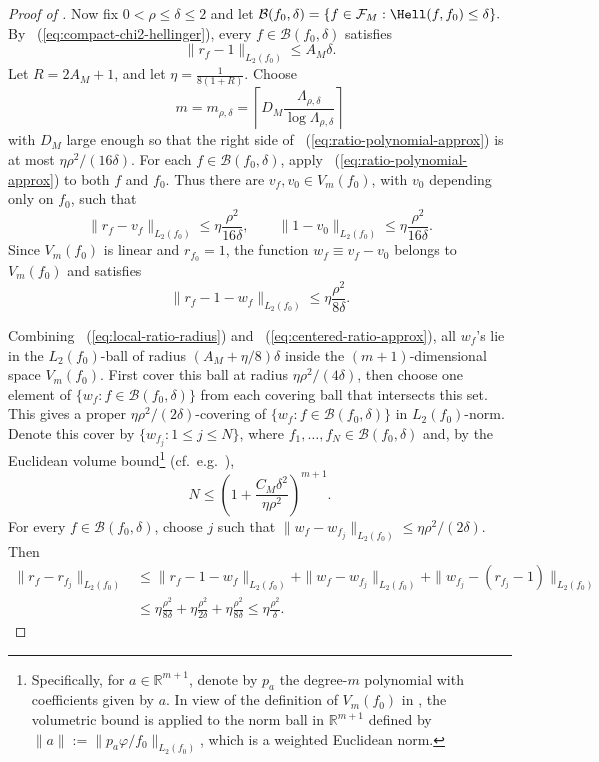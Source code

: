 \documentclass[letterpaper,11pt]{article}
\newcommand{\eqref}[1]{~(\ref{#1})}
\newcommand{\reals}{\mathbb{R}}
\newcommand{\calF}{{\mathcal{F}}}
\theoremstyle{definition}
\begin{document}
\begin{proof}[Proof of ]
Now fix $0<\rho\le\delta\le2$ and let
$
\mathcal B(f_0,\delta)=\{f\in\calF_M:\Hell(f,f_0)\le\delta\}.
$
By \eqref{eq:compact-chi2-hellinger}, every $f\in\mathcal B(f_0,\delta)$
satisfies
\begin{equation}
\label{eq:local-ratio-radius}
\|r_f-1\|_{L_2(f_0)}\le A_M\delta.
\end{equation}
Let $R=2A_M+1$, and let $\eta=\frac{1}{8(1+R)}$.
Choose
\[
m=m_{\rho,\delta}
=\left\lceil D_M
\frac{\Lambda_{\rho,\delta}}{\log\Lambda_{\rho,\delta}}\right\rceil
\]
with $D_M$ large enough so that the right side of
\eqref{eq:ratio-polynomial-approx} is at most
$\eta\rho^2/(16\delta)$.  For each $f\in\mathcal B(f_0,\delta)$, apply
\eqref{eq:ratio-polynomial-approx} to both $f$ and $f_0$.  Thus there are
$v_f,v_0\in V_m(f_0)$, with $v_0$ depending only on $f_0$, such that
\[
\|r_f-v_f\|_{L_2(f_0)}\le \eta\frac{\rho^2}{16\delta},
\qquad
\|1-v_0\|_{L_2(f_0)}\le \eta\frac{\rho^2}{16\delta}.
\]
Since $V_m(f_0)$ is linear and $r_{f_0}=1$, the function $w_f\equiv v_f-v_0$ belongs
to $V_m(f_0)$ and satisfies
\begin{equation}
\label{eq:centered-ratio-approx}
\|r_f-1-w_f\|_{L_2(f_0)}\le \eta\frac{\rho^2}{8\delta}.
\end{equation}

Combining \eqref{eq:local-ratio-radius} and
\eqref{eq:centered-ratio-approx}, all $w_f$'s lie in the $L_2(f_0)$-ball of
radius $(A_M+\eta/8)\delta$ inside the $(m+1)$-dimensional space $V_m(f_0)$.
First cover this ball at radius $\eta\rho^2/(4\delta)$, 
then choose one element of $\{w_f:f\in\mathcal B(f_0,\delta)\}$ from each
covering ball that intersects this set.  This gives a proper
$\eta\rho^2/(2\delta)$-covering of $\{w_f:f\in\mathcal B(f_0,\delta)\}$ in
$L_2(f_0)$-norm.
Denote this cover by $\{w_{f_j}:1\le j\le N\}$, where 
$f_1,\ldots,f_N\in\mathcal B(f_0,\delta)$ and, by the Euclidean volume bound\footnote{Specifically, for $a\in\reals^{m+1}$, denote by $p_a$ the degree-$m$ polynomial with coefficients given by $a$. In view of the definition of $V_m(f_0)$ in , the volumetric bound is applied to the norm ball in $\reals^{m+1}$ defined by $\|a\| := \|p_a \varphi/f_0\|_{L_2(f_0)}$, which is a weighted Euclidean norm.}
(cf.~e.g.~\cite[Corollary 27.4]{polyanskiy.wu.2025}),
\[
N\le
\left(1+\frac{C_M\delta^2}{\eta\rho^2}\right)^{m+1}.
\]
For every $f\in\mathcal B(f_0,\delta)$, choose $j$ such that
$\|w_f-w_{f_j}\|_{L_2(f_0)}\le\eta\rho^2/(2\delta)$.  Then
\[
\begin{aligned}
\|r_f-r_{f_j}\|_{L_2(f_0)}
&\le
\|r_f-1-w_f\|_{L_2(f_0)}
+\|w_f-w_{f_j}\|_{L_2(f_0)}
+\|w_{f_j}-(r_{f_j}-1)\|_{L_2(f_0)}  \\
&\le \eta\frac{\rho^2}{8\delta}
+\eta\frac{\rho^2}{2\delta}
+\eta\frac{\rho^2}{8\delta}
\le \eta\frac{\rho^2}{\delta}.
\end{aligned}
\]


\end{proof}
\end{document}
